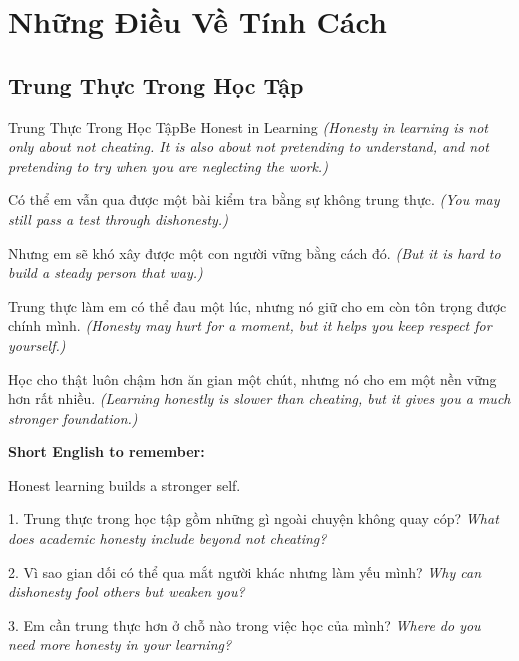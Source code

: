 \chapter{Những Điều Về Tính Cách}

\section{Trung Thực Trong Học Tập}
\begin{truyen}{Trung Thực Trong Học Tập}{Be Honest in Learning}
\textit{(Honesty in learning is not only about not cheating. It is also about not pretending to understand, and not pretending to try when you are neglecting the work.)}

Có thể em vẫn qua được một bài kiểm tra bằng sự không trung thực.
\textit{(You may still pass a test through dishonesty.)}

Nhưng em sẽ khó xây được một con người vững bằng cách đó.
\textit{(But it is hard to build a steady person that way.)}

Trung thực làm em có thể đau một lúc, nhưng nó giữ cho em còn tôn trọng được chính mình.
\textit{(Honesty may hurt for a moment, but it helps you keep respect for yourself.)}
\end{truyen}

\begin{baihoc}
Học cho thật luôn chậm hơn ăn gian một chút, nhưng nó cho em một nền vững hơn rất nhiều.
\textit{(Learning honestly is slower than cheating, but it gives you a much stronger foundation.)}
\end{baihoc}

\begin{ghinhoanh}
\textbf{Short English to remember:}

Honest learning builds a stronger self.

\end{ghinhoanh}

\begin{tuhocnhanh}
1. Trung thực trong học tập gồm những gì ngoài chuyện không quay cóp? \textit{What does academic honesty include beyond not cheating?}

2. Vì sao gian dối có thể qua mắt người khác nhưng làm yếu mình? \textit{Why can dishonesty fool others but weaken you?}

3. Em cần trung thực hơn ở chỗ nào trong việc học của mình? \textit{Where do you need more honesty in your learning?}
\end{tuhocnhanh}
\ngancach

